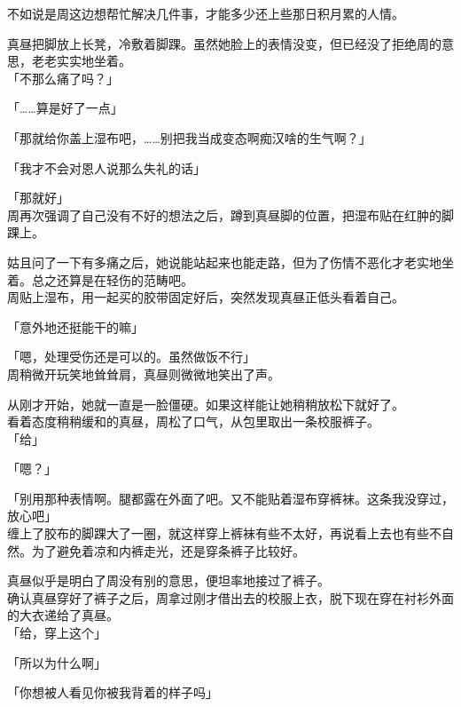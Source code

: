 不如说是周这边想帮忙解决几件事，才能多少还上些那日积月累的人情。

真昼把脚放上长凳，冷敷着脚踝。虽然她脸上的表情没变，但已经没了拒绝周的意思，老老实实地坐着。\\

「不那么痛了吗？」

「……算是好了一点」

「那就给你盖上湿布吧，……别把我当成变态啊痴汉啥的生气啊？」

「我才不会对恩人说那么失礼的话」

「那就好」\\

周再次强调了自己没有不好的想法之后，蹲到真昼脚的位置，把湿布贴在红肿的脚踝上。

姑且问了一下有多痛之后，她说能站起来也能走路，但为了伤情不恶化才老实地坐着。总之还算是在轻伤的范畴吧。\\

周贴上湿布，用一起买的胶带固定好后，突然发现真昼正低头看着自己。

「意外地还挺能干的嘛」

「嗯，处理受伤还是可以的。虽然做饭不行」\\

周稍微开玩笑地耸耸肩，真昼则微微地笑出了声。

从刚才开始，她就一直是一脸僵硬。如果这样能让她稍稍放松下就好了。\\

看着态度稍稍缓和的真昼，周松了口气，从包里取出一条校服裤子。\\

「给」

「嗯？」

「别用那种表情啊。腿都露在外面了吧。又不能贴着湿布穿裤袜。这条我没穿过，放心吧」\\

缠上了胶布的脚踝大了一圈，就这样穿上裤袜有些不太好，再说看上去也有些不自然。为了避免着凉和内裤走光，还是穿条裤子比较好。

真昼似乎是明白了周没有别的意思，便坦率地接过了裤子。\\

确认真昼穿好了裤子之后，周拿过刚才借出去的校服上衣，脱下现在穿在衬衫外面的大衣递给了真昼。\\

「给，穿上这个」

「所以为什么啊」

「你想被人看见你被我背着的样子吗」\\


